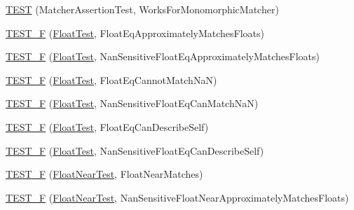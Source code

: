 \begin{DoxyCompactItemize}
\item 
\hyperlink{namespacetesting_1_1gmock__matchers__test_a0fe4bde05f667c4877e3b4a4a7bde002}{T\+E\+ST} (Matcher\+Assertion\+Test, Works\+For\+Monomorphic\+Matcher)
\item 
\hyperlink{namespacetesting_1_1gmock__matchers__test_a69257e935b4334c835b3ad26acea9104}{T\+E\+S\+T\+\_\+F} (\hyperlink{namespacetesting_1_1gmock__matchers__test_a145329e433869625f9f0e98a0cdfd7b4}{Float\+Test}, Float\+Eq\+Approximately\+Matches\+Floats)
\item 
\hyperlink{namespacetesting_1_1gmock__matchers__test_abb691880cd22f6f444c978547b13f792}{T\+E\+S\+T\+\_\+F} (\hyperlink{namespacetesting_1_1gmock__matchers__test_a145329e433869625f9f0e98a0cdfd7b4}{Float\+Test}, Nan\+Sensitive\+Float\+Eq\+Approximately\+Matches\+Floats)
\item 
\hyperlink{namespacetesting_1_1gmock__matchers__test_a111f0c8a5ec17b47e8eb6226e1c2cb58}{T\+E\+S\+T\+\_\+F} (\hyperlink{namespacetesting_1_1gmock__matchers__test_a145329e433869625f9f0e98a0cdfd7b4}{Float\+Test}, Float\+Eq\+Cannot\+Match\+NaN)
\item 
\hyperlink{namespacetesting_1_1gmock__matchers__test_a4e9d89902e088a10915b4f9463ac0f09}{T\+E\+S\+T\+\_\+F} (\hyperlink{namespacetesting_1_1gmock__matchers__test_a145329e433869625f9f0e98a0cdfd7b4}{Float\+Test}, Nan\+Sensitive\+Float\+Eq\+Can\+Match\+NaN)
\item 
\hyperlink{namespacetesting_1_1gmock__matchers__test_a264de01a5019e5c358116845bf5edd14}{T\+E\+S\+T\+\_\+F} (\hyperlink{namespacetesting_1_1gmock__matchers__test_a145329e433869625f9f0e98a0cdfd7b4}{Float\+Test}, Float\+Eq\+Can\+Describe\+Self)
\item 
\hyperlink{namespacetesting_1_1gmock__matchers__test_a95a2bbc273ff70fc364c5c9c4697834c}{T\+E\+S\+T\+\_\+F} (\hyperlink{namespacetesting_1_1gmock__matchers__test_a145329e433869625f9f0e98a0cdfd7b4}{Float\+Test}, Nan\+Sensitive\+Float\+Eq\+Can\+Describe\+Self)
\item 
\hyperlink{namespacetesting_1_1gmock__matchers__test_a6897409da5003f20f891d8a5ecabdc99}{T\+E\+S\+T\+\_\+F} (\hyperlink{namespacetesting_1_1gmock__matchers__test_a426b51f464dcb48033946e1bf3cc8795}{Float\+Near\+Test}, Float\+Near\+Matches)
\item 
\hyperlink{namespacetesting_1_1gmock__matchers__test_ad396e996ed685fd80cbd78740b8d01a8}{T\+E\+S\+T\+\_\+F} (\hyperlink{namespacetesting_1_1gmock__matchers__test_a426b51f464dcb48033946e1bf3cc8795}{Float\+Near\+Test}, Nan\+Sensitive\+Float\+Near\+Approximately\+Matches\+Floats)

\end{DoxyCompactItemize}
